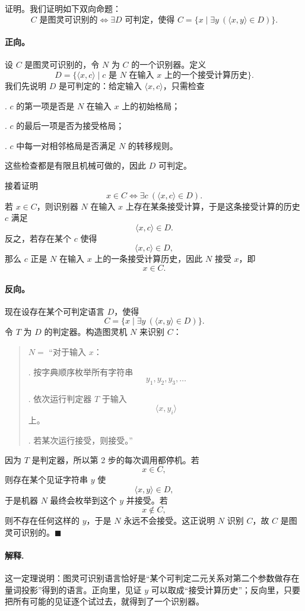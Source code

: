 \begin{answerred}
证明。我们证明如下双向命题：
\[
    C\text{ 是图灵可识别的}
    \iff
    \exists D\text{ 可判定，使得 }
    C=\{x\mid \exists y\ (\langle x,y\rangle\in D)\}.
\]

\paragraph{正向。}
设 $C$ 是图灵可识别的，令 $N$ 为 $C$ 的一个识别器。定义
\[
    D=\{\langle x,c\rangle\mid c\text{ 是 }N\text{ 在输入 }x\text{ 上的一个接受计算历史}\}.
\]
我们先说明 $D$ 是可判定的：给定输入 $\langle x,c\rangle$，只需检查

\medskip
{}. $c$ 的第一项是否是 $N$ 在输入 $x$ 上的初始格局；

\medskip
{}. $c$ 的最后一项是否为接受格局；

\medskip
{}. $c$ 中每一对相邻格局是否满足 $N$ 的转移规则。

\medskip
这些检查都是有限且机械可做的，因此 $D$ 可判定。

\medskip
接着证明
\[
    x\in C
    \iff
    \exists c\ (\langle x,c\rangle\in D).
\]
若 $x\in C$，则识别器 $N$ 在输入 $x$ 上存在某条接受计算，于是这条接受计算的历史 $c$ 满足
\[
    \langle x,c\rangle\in D.
\]
反之，若存在某个 $c$ 使得
\[
    \langle x,c\rangle\in D,
\]
那么 $c$ 正是 $N$ 在输入 $x$ 上的一条接受计算历史，因此 $N$ 接受 $x$，即
\[
    x\in C.
\]

\paragraph{反向。}
现在设存在某个可判定语言 $D$，使得
\[
    C=\{x\mid \exists y\ (\langle x,y\rangle\in D)\}.
\]
令 $T$ 为 $D$ 的判定器。构造图灵机 $N$ 来识别 $C$：

\begin{quote}
$N=$ ``对于输入 $x$：

\medskip
{}. 按字典顺序枚举所有字符串
\[
    y_1,y_2,y_3,\dots
\]

\medskip
{}. 依次运行判定器 $T$ 于输入
\[
    \langle x,y_i\rangle
\]
上。

\medskip
{}. 若某次运行接受，则接受。''
\end{quote}

因为 $T$ 是判定器，所以第 2 步的每次调用都停机。若
\[
    x\in C,
\]
则存在某个见证字符串 $y$ 使
\[
    \langle x,y\rangle\in D,
\]
于是机器 $N$ 最终会枚举到这个 $y$ 并接受。若
\[
    x\notin C,
\]
则不存在任何这样的 $y$，于是 $N$ 永远不会接受。这正说明 $N$ 识别 $C$，故 $C$ 是图灵可识别的。$\blacksquare$

\begin{answernote}
\paragraph{解释.}
这一定理说明：图灵可识别语言恰好是“某个可判定二元关系对第二个参数做存在量词投影”得到的语言。正向里，见证 $y$ 可以取成“接受计算历史”；反向里，只要把所有可能的见证逐个试过去，就得到了一个识别器。

\end{answernote}
\end{answerred}
